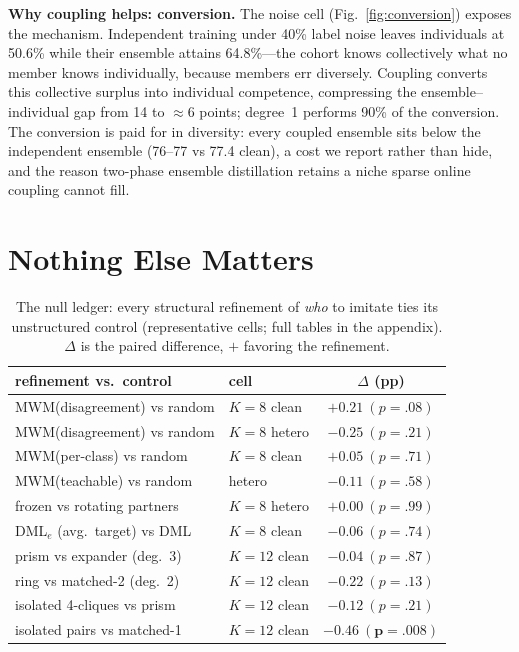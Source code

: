 \documentclass[10pt,twocolumn]{article}
\begin{document}
\textbf{Why coupling helps: conversion.} The noise cell
(Fig.~\ref{fig:conversion}) exposes the mechanism. Independent training under
40\% label noise leaves individuals at 50.6\% while their ensemble attains
64.8\%---the cohort knows collectively what no member knows individually,
because members err diversely. Coupling converts this collective surplus
into individual competence, compressing the ensemble--individual gap from 14
to $\approx$6 points; degree~1 performs 90\% of the conversion. The
conversion is paid for in diversity: every coupled ensemble sits below the
independent ensemble (76--77 vs 77.4 clean), a cost we report rather than
hide, and the reason two-phase ensemble distillation retains a niche sparse
online coupling cannot fill.

\section{Nothing Else Matters}
\label{sec:nulls}

\begin{table}[t]
\centering\small
\caption{The null ledger: every structural refinement of \emph{who} to
imitate ties its unstructured control (representative cells; full tables in
the appendix). $\Delta$ is the paired difference, $+$ favoring the
refinement.}
\label{tab:nulls}
\begin{tabular}{llc}
\toprule
refinement vs.\ control & cell & $\Delta$ (pp)\\
\midrule
MWM(disagreement) vs random     & $K{=}8$ clean  & $+0.21\ (p{=}.08)$\\
MWM(disagreement) vs random     & $K{=}8$ hetero & $-0.25\ (p{=}.21)$\\
MWM(per-class) vs random        & $K{=}8$ clean  & $+0.05\ (p{=}.71)$\\
MWM(teachable) vs random        & hetero         & $-0.11\ (p{=}.58)$\\
frozen vs rotating partners     & $K{=}8$ hetero & $+0.00\ (p{=}.99)$\\
DML$_e$ (avg.\ target) vs DML   & $K{=}8$ clean  & $-0.06\ (p{=}.74)$\\
prism vs expander (deg.\ 3)     & $K{=}12$ clean & $-0.04\ (p{=}.87)$\\
ring vs matched-2 (deg.\ 2)     & $K{=}12$ clean & $-0.22\ (p{=}.13)$\\
isolated 4-cliques vs prism     & $K{=}12$ clean & $-0.12\ (p{=}.21)$\\
isolated pairs vs matched-1     & $K{=}12$ clean & $\mathbf{-0.46\ (p{=}.008)}$\\
\bottomrule
\end{tabular}
\end{table}
\end{document}
